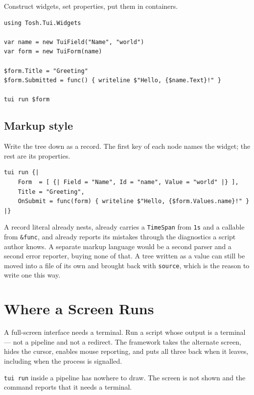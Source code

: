 \documentclass[11pt,a4paper,twoside,openany]{book}
\newcommand{\tosh}[1]{\lstinline[language=tosh]{#1}}
\newcommand{\code}[1]{\texttt{\small #1}}
\begin{document}
Construct widgets, set properties, put them in containers.

\begin{lstlisting}
using Tosh.Tui.Widgets

var name = new TuiField("Name", "world")
var form = new TuiForm(name)

$form.Title = "Greeting"
$form.Submitted = func() { writeline $"Hello, {$name.Text}!" }

tui run $form
\end{lstlisting}

\subsection{Markup style}

Write the tree down as a record. The first key of each node names the widget; the
rest are its properties.

\begin{lstlisting}
tui run {|
    Form  = [ {| Field = "Name", Id = "name", Value = "world" |} ],
    Title = "Greeting",
    OnSubmit = func(form) { writeline $"Hello, {$form.Values.name}!" }
|}
\end{lstlisting}

\begin{notebox}
A record literal already nests, already carries a \code{TimeSpan} from
\tosh{1s} and a callable from \tosh{&func}, and already reports its mistakes
through the diagnostics a script author knows. A separate markup language would
be a second parser and a second error reporter, buying none of that. A tree
written as a value can still be moved into a file of its own and brought back
with \tosh{source}, which is the reason to write one this way.
\end{notebox}

\section{Where a Screen Runs}

A full-screen interface needs a terminal. Run a script whose output is a
terminal --- not a pipeline and not a redirect. The framework takes the alternate
screen, hides the cursor, enables mouse reporting, and puts all three back when it
leaves, including when the process is signalled.

\begin{warnbox}
\tosh{tui run} inside a pipeline has nowhere to draw. The screen is not shown and
the command reports that it needs a terminal.
\end{warnbox}
\end{document}

